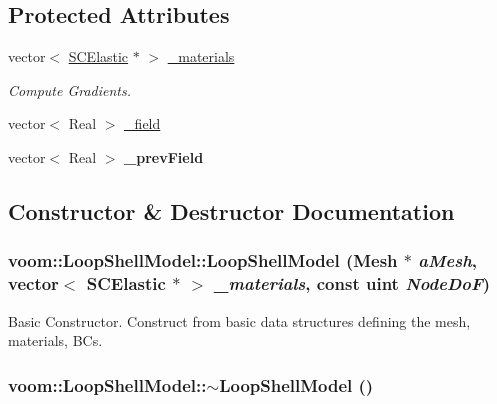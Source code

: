 \subsection*{Protected Attributes}
\begin{DoxyCompactItemize}
\item 
vector$<$ \hyperlink{classvoom_1_1_s_c_elastic}{SCElastic} $\ast$ $>$ \hyperlink{classvoom_1_1_loop_shell_model_a7bfa9ffa46a7825653c120c0c8d68e4d}{\_\-materials}
\begin{DoxyCompactList}\small\item\em Compute Gradients. \item\end{DoxyCompactList}\item 
vector$<$ Real $>$ \hyperlink{classvoom_1_1_loop_shell_model_a958c90bd8d68604e72eb8a6d0ef15255}{\_\-field}
\item 
\hypertarget{classvoom_1_1_loop_shell_model_ace61b925c6ba2f6a4a8367b36ccf758d}{
vector$<$ Real $>$ {\bfseries \_\-prevField}}
\label{classvoom_1_1_loop_shell_model_ace61b925c6ba2f6a4a8367b36ccf758d}

\end{DoxyCompactItemize}


\subsection{Constructor \& Destructor Documentation}
\hypertarget{classvoom_1_1_loop_shell_model_ae66f6b807e3e3826b36cfdd12f8ba527}{
\subsubsection[{LoopShellModel}]{\setlength{\rightskip}{0pt plus 5cm}voom::LoopShellModel::LoopShellModel ({\bf Mesh} $\ast$ {\em aMesh}, \/  vector$<$ {\bf SCElastic} $\ast$ $>$ {\em \_\-materials}, \/  const uint {\em NodeDoF})}}
\label{classvoom_1_1_loop_shell_model_ae66f6b807e3e3826b36cfdd12f8ba527}


Basic Constructor. Construct from basic data structures defining the mesh, materials, BCs. \hypertarget{classvoom_1_1_loop_shell_model_a15cc107dc37248847613f260b427bb4f}{
\subsubsection[{$\sim$LoopShellModel}]{\setlength{\rightskip}{0pt plus 5cm}voom::LoopShellModel::$\sim$LoopShellModel ()}}
\label{classvoom_1_1_loop_shell_model_a15cc107dc37248847613f260b427bb4f}


